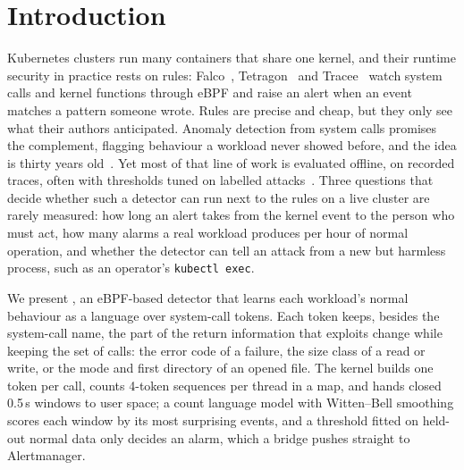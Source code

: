 \section{Introduction}\label{sec:intro}

Kubernetes clusters run many containers that share one kernel, and their runtime security in practice rests on rules:
Falco~\cite{falco}, Tetragon~\cite{tetragon} and Tracee~\cite{tracee} watch system calls and kernel functions through
eBPF and raise an alert when an event matches a pattern someone wrote. Rules are precise and cheap, but they only see
what their authors anticipated. Anomaly detection from system calls promises the complement, flagging behaviour a
workload never showed before, and the idea is thirty years old~\cite{forrest1996}. Yet most of that line of work is
evaluated offline, on recorded traces, often with thresholds tuned on labelled attacks~\cite{arp2022}. Three
questions that decide whether such a detector can run next to the rules on a live cluster are rarely measured: how long
an alert takes from the kernel event to the person who must act, how many alarms a real workload produces per hour of
normal operation, and whether the detector can tell an attack from a new but harmless process, such as an operator's
\texttt{kubectl exec}.

We present \sys, an eBPF-based detector that learns each workload's normal behaviour as a language over system-call
tokens. Each token keeps, besides the system-call name, the part of the return information that exploits change while
keeping the set of calls: the error code of a failure, the size class of a read or write, or the mode and first
directory of an opened file. The kernel builds one token per call, counts 4-token sequences per thread in a map, and
hands closed 0.5\,s windows to user space; a count language model with Witten--Bell smoothing scores each window by its
most surprising events, and a threshold fitted on held-out normal data only decides an alarm, which a bridge pushes
straight to Alertmanager.

